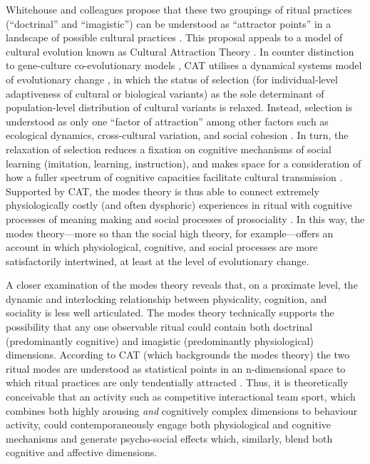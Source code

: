 \begin{CJK}{UTF8}{gbsn}
Whitehouse and colleagues propose that these two groupings of ritual practices (``doctrinal'' and ``imagistic'') can be understood as ``attractor points'' in a landscape of possible cultural practices \citep{Atkinson2011,Whitehouse2014}.  This proposal appeals to a model of cultural evolution known as Cultural Attraction Theory \citep[hereafter CAT; an extension of Sperber's ``epidemiology of representations,'' see][]{Sperber1996,Claidiere2007,Claidiere2014}.  In counter distinction to gene-culture co-evolutionary models \citep[, which largely adhere to the ``selectionist'' paradigm, see][]{Acerbi2015}, CAT utilises a dynamical systems model of evolutionary change \citep[known generally as ``evolutionary systems theory,'' cf.][]{Ramstead2018}, in which the status of selection (for individual-level adaptiveness of cultural or biological variants) as the sole determinant of population-level distribution of cultural variants is relaxed.  Instead, selection is understood as only one ``factor of attraction'' among other factors such as ecological dynamics, cross-cultural variation, and social cohesion \citep{Claidiere2014,Heyes2011}. In turn, the relaxation of selection reduces a fixation on cognitive mechanisms of social learning (imitation, learning, instruction), and makes space for a consideration of how a fuller spectrum of cognitive capacities facilitate cultural transmission \citep{Acerbi2015}.  Supported by CAT, the modes theory is thus able to connect extremely physiologically costly (and often dysphoric) experiences in ritual with cognitive processes of meaning making and social processes of prosociality \citep[including extreme levels of pro-group sacrifice ][]{Whitehouse2014,Whitehouse2017}.  In this way, the modes theory---more so than the social high theory, for example---offers an account in which physiological, cognitive, and social processes are more satisfactorily intertwined, at least at the level of evolutionary change.

A closer examination of the modes theory reveals that, on a proximate level, the dynamic and interlocking relationship between physicality, cognition, and sociality is less well articulated.  The modes theory technically supports the possibility that any one observable ritual could contain both doctrinal (predominantly cognitive) and imagistic (predominantly physiological) dimensions.  According to CAT (which backgrounds the modes theory) the two ritual modes are understood as statistical points in an n-dimensional space to which ritual practices are only tendentially attracted \citep{Atkinson2011,Whitehouse2014a,Scott-Phillips2017}.  Thus, it is theoretically conceivable that an activity such as competitive interactional team sport, which combines both highly arousing \textit{and} cognitively complex dimensions to behaviour activity,  could contemporaneously engage both physiological and cognitive mechanisms and generate psycho-social effects which, similarly, blend both cognitive and affective dimensions.


\end{CJK}
